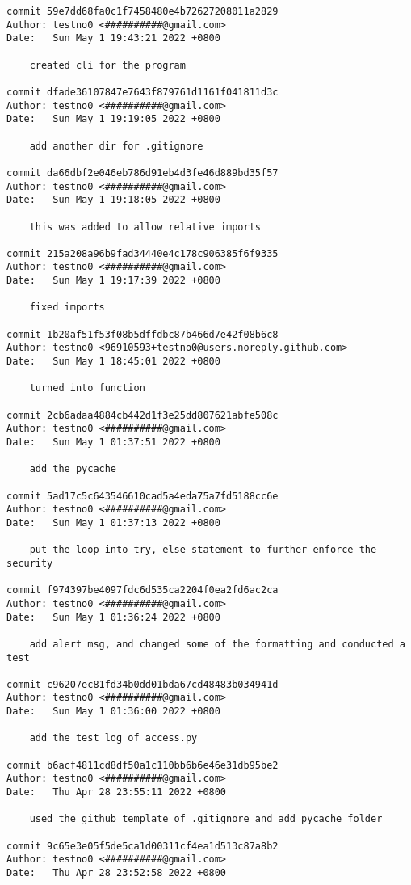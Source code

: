 \documentclass[12pt]{article}
\begin{document}
\begin{lstlisting}[caption={\texttt{git} log of the development.}]
commit 59e7dd68fa0c1f7458480e4b72627208011a2829
Author: testno0 <##########@gmail.com>
Date:   Sun May 1 19:43:21 2022 +0800

	created cli for the program

commit dfade36107847e7643f879761d1161f041811d3c
Author: testno0 <##########@gmail.com>
Date:   Sun May 1 19:19:05 2022 +0800

	add another dir for .gitignore

commit da66dbf2e046eb786d91eb4d3fe46d889bd35f57
Author: testno0 <##########@gmail.com>
Date:   Sun May 1 19:18:05 2022 +0800

	this was added to allow relative imports

commit 215a208a96b9fad34440e4c178c906385f6f9335
Author: testno0 <##########@gmail.com>
Date:   Sun May 1 19:17:39 2022 +0800

	fixed imports

commit 1b20af51f53f08b5dffdbc87b466d7e42f08b6c8
Author: testno0 <96910593+testno0@users.noreply.github.com>
Date:   Sun May 1 18:45:01 2022 +0800

	turned into function

commit 2cb6adaa4884cb442d1f3e25dd807621abfe508c
Author: testno0 <##########@gmail.com>
Date:   Sun May 1 01:37:51 2022 +0800

	add the pycache

commit 5ad17c5c643546610cad5a4eda75a7fd5188cc6e
Author: testno0 <##########@gmail.com>
Date:   Sun May 1 01:37:13 2022 +0800

	put the loop into try, else statement to further enforce the security

commit f974397be4097fdc6d535ca2204f0ea2fd6ac2ca
Author: testno0 <##########@gmail.com>
Date:   Sun May 1 01:36:24 2022 +0800

	add alert msg, and changed some of the formatting and conducted a test

commit c96207ec81fd34b0dd01bda67cd48483b034941d
Author: testno0 <##########@gmail.com>
Date:   Sun May 1 01:36:00 2022 +0800

	add the test log of access.py

commit b6acf4811cd8df50a1c110bb6b6e46e31db95be2
Author: testno0 <##########@gmail.com>
Date:   Thu Apr 28 23:55:11 2022 +0800

	used the github template of .gitignore and add pycache folder

commit 9c65e3e05f5de5ca1d00311cf4ea1d513c87a8b2
Author: testno0 <##########@gmail.com>
Date:   Thu Apr 28 23:52:58 2022 +0800


\end{lstlisting}
\end{document}
